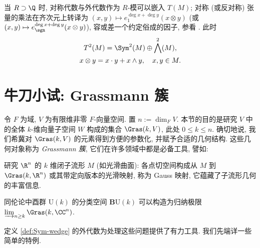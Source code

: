 当 $R \supset \Q$ 时, 对称代数与外代数作为 $R$-模可以嵌入 $T(M)$; 对称 (或反对称) 张量的乘法在齐次元上转译为 $(x,y) \mapsto e^{\deg x + \deg y}_1(x \otimes y)$ (或 $(x, y) \mapsto e^{\deg x + \deg y}_{\sgn}(x \otimes y)$), 容或差一个约定俗成的因子, 参看 \cite[\S 2 (3.1)]{ChCh}. 此时
\begin{gather*}
	T^2(M) = \Sym^2(M) \oplus \bigwedge^2(M), \\
	x \otimes y = x \cdot y + x \wedge y, \quad x,y \in M.
\end{gather*}

\section{牛刀小试: Grassmann 簇}\label{sec:Grassmannian}
令 $F$ 为域, $V$ 为有限维非零 $F$-向量空间. 置 $n := \dim_F V$. 本节的目的是研究 $V$ 中的全体 $k$-维向量子空间 $W$ 构成的集合 $\Gras(k, V)$, 此处 $0 \leq k \leq n$. 确切地说, 我们希冀对 $\Gras(k,V)$ 的元素得到方便的参数化, 并赋予合适的几何结构. 这些几何对象称为 \emph{Grassmann 簇}, 它们在许多领域中都是必备工具, 譬如: 
\begin{compactenum}[(a)]
	\item 研究 $\R^n$ 的 $k$ 维闭子流形 $M$ (如光滑曲面): 各点切空间构成从 $M$ 到 $\Gras(k, \R^n)$ 或其带定向版本的光滑映射, 称为 Gauss 映射, 它蕴藏了子流形几何的丰富信息.
	\item 同伦论中酉群 $\mathrm{U}(k)$ 的分类空间 $\mathbf{B}\mathrm{U}(k)$ 可以构造为归纳极限 $\varinjlim_{n \geq k}\Gras(k, \CC^n)$.
\end{compactenum}
定义 \ref{def:Sym-wedge} 的外代数为处理这些问题提供了有力工具. 我们先端详一些简单的特例.
